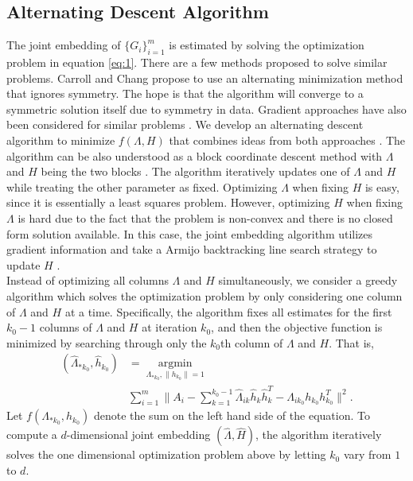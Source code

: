 \documentclass[10pt,journal,compsoc]{IEEEtran}
\begin{document}
\subsection{Alternating Descent Algorithm}
\noindent The joint embedding of $\{G_i \} _{i=1}^{m}$ is estimated by solving the optimization problem in equation \eqref{eq:1}. There are a few methods proposed to solve similar problems. Carroll and Chang \cite{carroll1970analysis} propose to use an alternating minimization method that ignores symmetry. The hope is that the algorithm will converge to a symmetric solution itself due to symmetry in data. Gradient approaches have also been considered for similar problems \cite{tang2009clustering, kolda2015numerical}. We develop an alternating descent algorithm to minimize $f(\Lambda,H)$ that combines ideas from both approaches \cite{bezdek2003convergence}. The algorithm can be also understood as a block coordinate descent method with $\Lambda$ and $H$ being the two blocks \cite{wright2015coordinate,beck2013convergence}. The algorithm iteratively updates one of $\Lambda$ and $H$ while treating the other parameter as fixed. Optimizing $\Lambda$ when fixing $H$ is easy, since it is essentially a least squares problem. However, optimizing $H$ when fixing $\Lambda$ is hard due to the fact that the problem is non-convex and there is no closed form solution available. In this case, the joint embedding algorithm utilizes gradient information and take a Armijo backtracking line search strategy to update $H$  \cite{nocedal2006numerical}. \\

\noindent Instead of optimizing all columns $\Lambda$ and $H$ simultaneously, we consider a greedy algorithm which solves the optimization problem by only considering one column of  $\Lambda$ and $H$ at a time. Specifically, the algorithm fixes all estimates for the first $k_0-1$ columns of $\Lambda$ and $H$ at iteration $k_0$, and then the objective function is minimized by searching through only the $k_0$th column of $\Lambda$ and $H$. That is,
\begin{align}(\hat{\Lambda}_{*k_0},\hat{h}_{k_0}) &= \underset{\Lambda_{*k_0},\|h_{k_0}\|=1}{\operatorname{argmin}} \nonumber\\ &\sum\limits_{i=1}^{m} \| A_i- \sum\limits_{k=1}^{k_0-1} \hat{\Lambda}_{ik} \hat{h}_{k} \hat{h}_{k}^T -\Lambda_{ik_0} h_{k_0} h_{k_0}^T\|  ^2.
\label{eq:2}
\end{align} 
Let $f(\Lambda_{*k_0},h_{k_0})$ denote the sum on the left hand side of the equation. To compute a $d$-dimensional joint embedding $(\hat{\Lambda},\hat{H})$, the algorithm iteratively solves the one dimensional optimization problem above by letting $k_0$ vary from $1$ to $d$. \\
\end{document}
